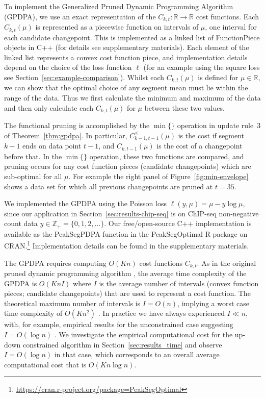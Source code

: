 \documentclass[twoside,11pt]{article}
\newcommand{\ZZ}{\mathbb Z}
\newcommand{\RR}{\mathbb R}
\begin{document}
To implement the Generalized Pruned Dynamic Programming Algorithm
(GPDPA), we use an exact representation of the
$C_{k,t}:\RR\rightarrow\RR$ cost functions. Each $C_{k,t}(\mu)$ is
represented as a piecewise function on intervals of $\mu$, one
interval for each candidate changepoint. This is implemented as a
linked list of FunctionPiece objects in C++ (for details see
supplementary materials). Each element of the linked list represents a
convex cost function piece, and implementation details depend on the
choice of the loss function $\ell$ (for an example using the square
loss see Section~\ref{sec:example-comparison}). Whilst each
$C_{k,t}(\mu)$ is defined for $\mu \in \RR$, we can show that the
optimal choice of any segment mean must lie within the range of the
data. Thus we first calculate the minimum and maximum of the data and
then only calculate each $C_{k,t}(\mu)$ for $\mu$ between these two
values.

The functional pruning is accomplished by the
$\min\{\}$ operation in update rule~3 of Theorem~\ref{thm:gpdpa}. In
particular, $C_{k-1,t-1}^\leq(\mu)$ is the cost if segment $k-1$
ends on data point $t-1$, and $C_{k,t-1}(\mu)$ is the cost of a
changepoint before that. In the $\min\{\}$ operation, these two
functions are compared, and pruning occurs for any cost function
pieces (candidate changepoints) which are sub-optimal for all $\mu$.
For example the right panel of Figure~\ref{fig:min-envelope} shows a
data set for which all previous changepoints are pruned at $t=35$.

We implemented the GPDPA using the Poisson loss
$\ell(y, \mu) = \mu - y\log \mu$, since our application in
Section~\ref{sec:results-chip-seq} is on ChIP-seq non-negative count data
$y\in\ZZ_+ = \{0, 1, 2, \dots\}$.
Our free/open-source C++ implementation is
available as the PeakSegPDPA function in the PeakSegOptimal R package
on
CRAN.\footnote{\url{https://cran.r-project.org/package=PeakSegOptimal}}
Implementation details can be found in the supplementary materials.

The GPDPA requires
computing $O(Kn)$ cost functions $C_{k,t}$. As in the original
pruned dynamic programming algorithm \citep{pruned-dp}, the average time
complexity of the GPDPA is $O(K n I)$ where $I$ is the average number of
intervals (convex function pieces; candidate changepoints) that are
used to represent a cost function. The theoretical maximum number of
intervals is $I=O(n)$, implying a worst case time complexity of $O(K n^2)$
\citep{pruned-dp-new}.
In practice we have always experienced $I\ll n$, with, for example,
empirical results for the unconstrained case suggesting $I=O(\log n)$
\citep{fpop}. We investigate the empirical computational cost for the
up-down constrained algorithm in Section~\ref{sec:results_time} and observe $I=O(\log n)$ in that
case, which corresponds to an overall average computational cost that
is $O(Kn\log n)$.
\end{document}
